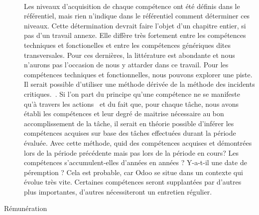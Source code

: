 \begin{description}
\paragraph{}Les niveaux d'acquisition de chaque compétence ont été définis dans le référentiel, mais rien n'indique dans le référentiel comment déterminer ces niveaux. Cette détermination devrait faire l'objet d'un chapitre entier, si pas d'un travail annexe. Elle diffère très fortement entre les compétences techniques et fonctionelles et entre les compétences génériques dites transversales. Pour ces dernières, la littérature est abondante et nous n'aurons pas l'occasion de nous y attarder dans ce travail. Pour les compétences techniques et fonctionnelles, nous pouvons explorer une piste. Il serait possible d'utiliser une méthode dérivée de la méthode des incidents critiques.~\citep[pp.272]{gestionressourceshumaine2002}. Si l'on part du principe qu'une compétence ne se manifeste qu'à travers les actions~\citep[pp.171]{gestionressourceshumaine2007} et du fait que, pour chaque tâche, nous avons établi les compétences et leur degré de maitrise nécessaire au bon accomplissement de la tâche, il serait en théorie possible d'inférer les compétences acquises sur base des tâches effectuées durant la période évaluée. Avec cette méthode, quid des compétences acquises et démontrées lors de la période précédente mais pas lors de la période en cours? Les compétences s'accumulent-elles d'années en années ? Y-a-t-il une date de péremption ? Cela est probable, car Odoo se situe dans un contexte qui évolue très vite. Certaines compétences seront supplantées par d'autres plus importantes, d'autres nécessiteront un entretien régulier. 
    \item[Rémunération]

\end{description}
